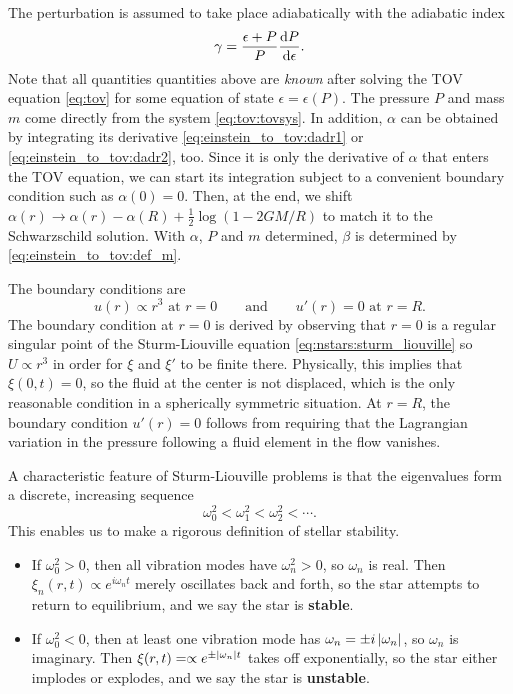 The perturbation is assumed to take place adiabatically with the adiabatic index
\begin{equation}
	\gamma = \frac{\epsilon + P}{P} \odv{P}{\epsilon} .
\label{eq:nstars:adiabatic_index}
\end{equation}
Note that all quantities quantities above are \emph{known} after solving the TOV equation \eqref{eq:tov} for some equation of state $\epsilon = \epsilon(P)$.
The pressure $P$ and mass $m$ come directly from the system \eqref{eq:tov:tovsys}.
In addition, $\alpha$ can be obtained by integrating its derivative \eqref{eq:einstein_to_tov:dadr1} or \eqref{eq:einstein_to_tov:dadr2}, too.
Since it is only the derivative of $\alpha$ that enters the TOV equation, we can start its integration subject to a convenient boundary condition such as $\alpha(0) = 0$.
Then, at the end, we shift $\alpha(r) \rightarrow \alpha(r) - \alpha(R) + \frac12 \log (1 - 2 G M / R)$ to match it to the Schwarzschild solution.
With $\alpha$, $P$ and $m$ determined, $\beta$ is determined by \eqref{eq:einstein_to_tov:def_m}.

The boundary conditions are \cite{ref:stability_methods}
\begin{equation}
	u(r) \propto r^3 \text{ at $r=0$}
	\qquad \text{and} \qquad
	u'(r) = 0 \text{ at $r=R$}.
\end{equation}
The boundary condition at $r=0$ is derived by observing that $r = 0$ is a regular singular point of the Sturm-Liouville equation \eqref{eq:nstars:sturm_liouville} so $U \propto r^3$ in order for $\xi$ and $\xi'$ to be finite there.
Physically, this implies that $\xi(0, t) = 0$, so the fluid at the center is not displaced, which is the only reasonable condition in a spherically symmetric situation.
At $r = R$, the boundary condition $u'(r) = 0$ follows from requiring that the Lagrangian variation in the pressure following a fluid element in the flow vanishes.

A characteristic feature of Sturm-Liouville problems is that the eigenvalues form a discrete, increasing sequence
\begin{equation}
	\omega_0^2 < \omega_1^2 < \omega_2^2 < \cdots .
\end{equation}
This enables us to make a rigorous definition of stellar stability.
\begin{itemize}
\item If $\omega_0^2 > 0$, then all vibration modes have $\omega_n^2 > 0$, so $\omega_n$ is real.
      Then $\xi_n(r, t) \propto e^{i \omega_n t}$ merely oscillates back and forth, so the star attempts to return to equilibrium, and we say the star is \textbf{stable}.
\item If $\omega_0^2 < 0$, then at least one vibration mode has $\omega_n = \pm i \left\lvert \omega_n \right\rvert$, so $\omega_n$ is imaginary.
      Then $\xi(r,t) = \propto e^{\pm \left\lvert \omega_n \right\rvert t}$ takes off exponentially, so the star either implodes or explodes, and we say the star is \textbf{unstable}.
\end{itemize}

